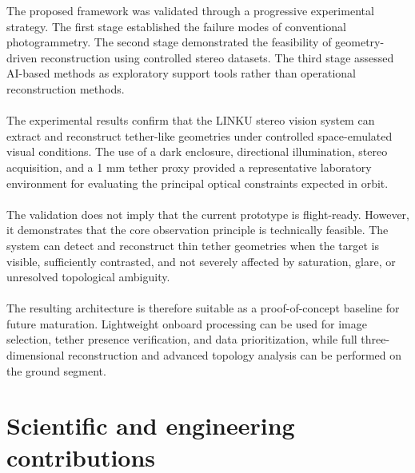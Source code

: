 The proposed framework was validated through a progressive experimental strategy. The first stage established the failure modes of conventional photogrammetry. The second stage demonstrated the feasibility of geometry-driven reconstruction using controlled stereo datasets. The third stage assessed AI-based methods as exploratory support tools rather than operational reconstruction methods.
\\\\
The experimental results confirm that the LINKU stereo vision system can extract and reconstruct tether-like geometries under controlled space-emulated visual conditions. The use of a dark enclosure, directional illumination, stereo acquisition, and a 1 mm tether proxy provided a representative laboratory environment for evaluating the principal optical constraints expected in orbit.
\\\\
The validation does not imply that the current prototype is flight-ready. However, it demonstrates that the core observation principle is technically feasible. The system can detect and reconstruct thin tether geometries when the target is visible, sufficiently contrasted, and not severely affected by saturation, glare, or unresolved topological ambiguity.
\\\\
The resulting architecture is therefore suitable as a proof-of-concept baseline for future maturation. Lightweight onboard processing can be used for image selection, tether presence verification, and data prioritization, while full three-dimensional reconstruction and advanced topology analysis can be performed on the ground segment.

\section{Scientific and engineering contributions}

